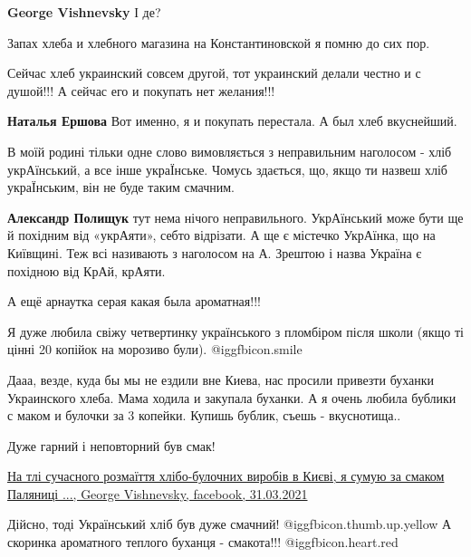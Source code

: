 \begin{itemize}
\begin{itemize}
\textbf{George Vishnevsky} І де?

\end{itemize} %

Запах хлеба и хлебного магазина на Константиновской я помню до сих пор.

Сейчас хлеб украинский совсем другой, тот украинский делали честно и с душой!!! А сейчас его и покупать нет желания!!!

\textbf{Наталья Ершова} Вот именно, я и покупать перестала. А был хлеб вкуснейший.


В моїй родині тільки одне слово вимовляється з неправильним наголосом - хліб
укрАїнський, а все інше украЇнське. Чомусь здається, що, якщо ти назвеш хліб
украЇнським, він не буде таким смачним.

\begin{itemize} %
\textbf{Александр Полищук} тут нема нічого неправильного. УкрАїнський може бути ще й похідним від «укрАяти», себто відрізати. А ще є містечко УкрАїнка, що на Київщині. Теж всі називають з наголосом на А. Зрештою і назва Україна є похідною від КрАй, крАяти.
\end{itemize} %

А ещё арнаутка серая какая была ароматная!!!

Я дуже любила свіжу четвертинку українського з пломбіром після школи (якщо ті
цінні 20 копійок на морозиво були).  @igg{fbicon.smile} 


Дааа, везде, куда бы мы не ездили вне Киева, нас просили привезти буханки
Украинского хлеба. Мама ходила и закупала буханки. А я очень любила бублики с
маком и булочки за 3 копейки. Купишь бублик, съешь - вкуснотища..

Дуже гарний і неповторний був смак!


\href{https://m.facebook.com/groups/1671741806381479/permalink/2819977861557862}{%
На тлі сучасного розмаїття хлібо-булочних виробів в Києві, я сумую за смаком %
Паляниці ..., George Vishnevsky, facebook, 31.03.2021%
}

Дійсно, тоді Український хліб був дуже смачний!  @igg{fbicon.thumb.up.yellow} А
скоринка ароматного теплого буханця - смакота!!! @igg{fbicon.heart.red}


\end{itemize}
